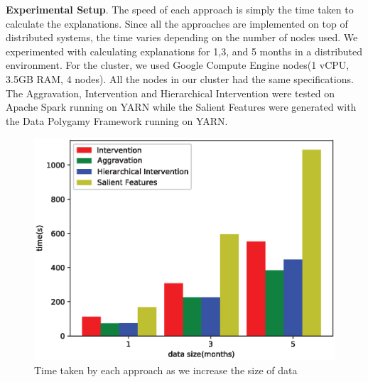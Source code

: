 \textbf{Experimental Setup}. The speed of each approach is simply the time taken to calculate the explanations. Since all the approaches are implemented on top of distributed systems, the time varies depending on the number of nodes used. We experimented with calculating explanations for 1,3, and 5 months in a distributed environment. For the cluster, we used Google Compute Engine nodes(1 vCPU, 3.5GB RAM, 4 nodes). All the nodes in our cluster had the same specifications. The Aggravation, Intervention and Hierarchical Intervention were tested on Apache Spark running on YARN while the Salient Features were generated with the Data Polygamy Framework running on YARN.
\begin{figure}[h]
\includegraphics[width=\columnwidth]{images/performance.eps}
\caption{Time taken by each approach as we increase the size of data}
\label{fig:performance}
\end{figure}
